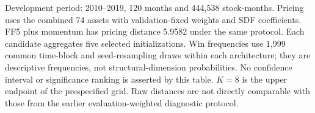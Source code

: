 \begin{widetable}[!tbp]
\centering
\caption{Conditional-autoencoder extension: complete development-period candidate comparison}
\label{tab:cae-candidates}
\small
\begin{threeparttable}
\noindent{}
\begin{tablenotes}[flushleft]\footnotesize
\item Development period: 2010--2019, 120 months and 444,538 stock-months. Pricing uses the combined 74 assets with validation-fixed weights and SDF coefficients. FF5 plus momentum has pricing distance 5.9582 under the same protocol. Each candidate aggregates five selected initializations. Win frequencies use 1,999 common time-block and seed-resampling draws within each architecture; they are descriptive frequencies, not structural-dimension probabilities. No confidence interval or significance ranking is asserted by this table. $K=8$ is the upper endpoint of the prespecified grid. Raw distances are not directly comparable with those from the earlier evaluation-weighted diagnostic protocol.
\end{tablenotes}
\end{threeparttable}
\end{widetable}
